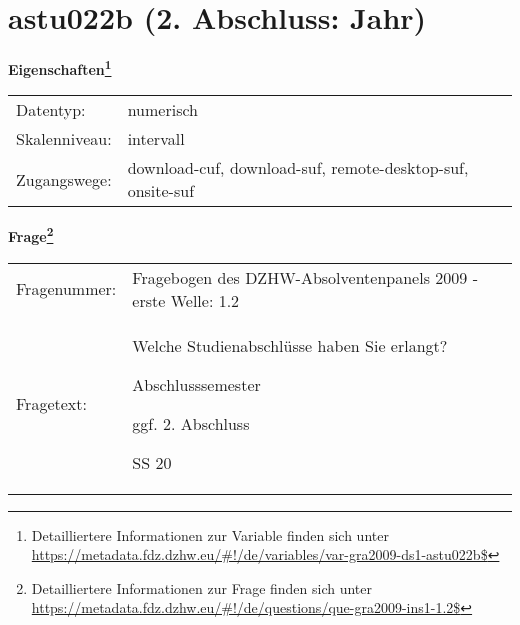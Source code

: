 
    \setcounter{footnote}{0}

    \vspace*{-1.8cm}
	\section{astu022b (2. Abschluss: Jahr)}
	\label{section:astu022b}



    \vspace*{0.5cm}
    \noindent\textbf{Eigenschaften\footnote{Detailliertere Informationen zur Variable finden sich unter
		\url{https://metadata.fdz.dzhw.eu/\#!/de/variables/var-gra2009-ds1-astu022b$}}}\\
	\begin{tabularx}{\hsize}{@{}lX}
	Datentyp: & numerisch \\
	Skalenniveau: & intervall \\
	Zugangswege: &
	  download-cuf, 
	  download-suf, 
	  remote-desktop-suf, 
	  onsite-suf
 \\
    \end{tabularx}



				\vspace*{0.5cm}
                \noindent\textbf{Frage\footnote{Detailliertere Informationen zur Frage finden sich unter
		              \url{https://metadata.fdz.dzhw.eu/\#!/de/questions/que-gra2009-ins1-1.2$}}}\\
				\begin{tabularx}{\hsize}{@{}lX}
					Fragenummer: &
					  Fragebogen des DZHW-Absolventenpanels 2009 - erste Welle:
					  1.2
 \\
					Fragetext: & Welche Studienabschlüsse haben Sie erlangt?\par  Abschlusssemester\par  ggf. 2. Abschluss\par  SS 20 \\
				\end{tabularx}





